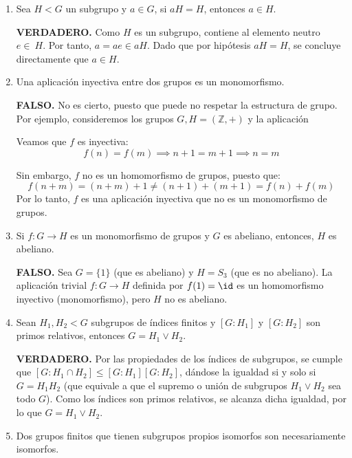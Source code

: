\documentclass[12pt]{article}
\begin{document}
\begin{ejercicio}[1 punto]
\begin{enumerate}
            \textbf{VERDADERO.} Por ejemplo, en el grupo infinito $(\mathbb{Z}, +)$, el subconjunto de los enteros positivos $\mathbb{Z}^+$ es cerrado bajo la suma, pero no contiene el elemento neutro ($0$) ni los elementos inversos, por lo que no es un subgrupo.
            \item Sea $H < G$ un subgrupo y $a \in G$, si $aH = H$, entonces $a \in H$.
            
            \textbf{VERDADERO.} Como $H$ es un subgrupo, contiene al elemento neutro $e \in~H$. Por tanto, $a = ae \in aH$. Dado que por hipótesis $aH = H$, se concluye directamente que $a \in H$.
            \item Una aplicación inyectiva entre dos grupos es un monomorfismo.
            
            \textbf{FALSO.} No es cierto, puesto que puede no respetar la estructura de grupo. Por ejemplo, consideremos los grupos $G,H = (\mathbb{Z}, +)$ y la aplicación

            Veamos que $f$ es inyectiva:
            \begin{equation*}
            f(n) = f(m) \implies n + 1 = m + 1 \implies n = m
            \end{equation*}

            Sin embargo, $f$ no es un homomorfismo de grupos, puesto que:
            \begin{equation*}
            f(n + m) = (n + m) + 1 \neq (n + 1) + (m + 1) = f(n) + f(m)
            \end{equation*}
             Por lo tanto, $f$ es una aplicación inyectiva que no es un monomorfismo de grupos.
            \item Si $f : G \to H$ es un monomorfismo de grupos y $G$ es abeliano, entonces, $H$ es abeliano.
            
            \textbf{FALSO.} Sea $G = \{1\}$ (que es abeliano) y $H = S_3$ (que es no abeliano). La aplicación trivial $f: G \to H$ definida por $f(1) = \id$ es un homomorfismo inyectivo (monomorfismo), pero $H$ no es abeliano.
            \item Sean $H_1, H_2 < G$ subgrupos de índices finitos y $[G : H_1]$ y $[G : H_2]$ son primos relativos, entonces $G = H_1 \vee H_2$.
            
            \textbf{VERDADERO.} Por las propiedades de los índices de subgrupos, se cumple que $[G : H_1 \cap H_2] \le [G : H_1][G : H_2]$, dándose la igualdad si y solo si $G = H_1 H_2$ (que equivale a que el supremo o unión de subgrupos $H_1 \vee H_2$ sea todo $G$). Como los índices son primos relativos, se alcanza dicha igualdad, por lo que $G = H_1 \vee H_2$.
            \item Dos grupos finitos que tienen subgrupos propios isomorfos son necesariamente isomorfos.
            

\end{enumerate}
\end{ejercicio}
\end{document}
